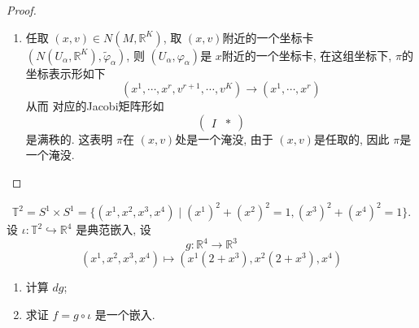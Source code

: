 \documentclass[../main.tex]{subfiles}
\begin{document}
\begin{proof}
\begin{enumerate}
\[   \begin{aligned}
     \tilde{\varphi} _{ \alpha }: N\left( U_{\alpha }, \mathbb{R} ^{K} \right)&\to  \varphi _{\alpha }\left( U_{\alpha } \right)\times \mathbb{R} ^{K-r}   \\ 
      \left( p, v_{p} \right)&\mapsto \left(  \varphi _{\alpha }\left( p \right), \left( \left<v_{p}, \left. E^{\alpha }_{r+ 1} \right|_{p} \right> ,\cdots , \left<v_{p},\left. E^{\alpha }_{K} \right|_{p} \right>\right)   \right)  
   \end{aligned}
    \]   它是一个连续的双射. 这样 \(  \left\{ \left( N\left( U_{\alpha }, \mathbb{R} ^{K} \right),  \tilde{\varphi} _{\alpha }  \right) \right\}   \) 构成 \(  N\left( M,\mathbb{R} ^{K} \right)   \)上的一族坐标卡. 最后, 我们来考虑这族坐标卡的过渡映射. 设 \(  \left( N\left( U_{\beta }, \mathbb{R} ^{K} \right),  \tilde{\varphi} _{\beta }  \right)   \)是另一个坐标卡, 则 过渡映射为\[
   \tilde{\varphi}_\beta \circ \tilde{\varphi}_\alpha^{-1}(x, c) = \left( (\varphi_\beta \circ \varphi_\alpha^{-1})(x), A(\varphi_\alpha^{-1}(x)) \cdot c \right)
    \] 其中  \(  A  \)是一个矩阵函数使得 $A_{ji}(p) = \langle E_i^\alpha(p), E_j^\beta(p) \rangle$, 是光滑的 . 又\(   \varphi _{\beta }\circ  \varphi _{\alpha }^{-1}   \)光滑,  因此 \(   \tilde{\varphi} _{\beta }\circ  \tilde{\varphi} _{\alpha }^{-1}   \)是光滑的. 因此 \(  \left\{ \left( N\left( U_{\alpha },\mathbb{R} ^{K} \right)   , \tilde{\varphi} _{\alpha } \right)  \right\}\)   构成 \(  N\left( M,\mathbb{R} ^{K} \right)   \)的一个光滑图册, 从而使得 其成为一个光滑流形. 

    \item 任取 \(  \left( x,v \right)\in N\left( M,\mathbb{R} ^{K} \right)    \), 取 \(  \left( x,v \right)   \)附近的一个坐标卡 \(  \left( N\left( U_{\alpha },\mathbb{R} ^{K} \right),  \tilde{\varphi} _{\alpha }  \right)   \), 则 \(  \left( U_{\alpha },  \varphi _{\alpha } \right)   \)是 \(  x  \)附近的一个坐标卡, 在这组坐标下,  \(   \pi   \)的坐标表示形如下 \[
    \left( x^{1},\cdots ,x^{r}, v^{r+ 1},\cdots ,v^{K} \right)\to \left( x^{1},\cdots ,x^{r} \right)  
    \]      从而 对应的Jacobi矩阵形如  \[
    \begin{pmatrix} 
        I&* 
    \end{pmatrix} 
    \]是满秩的. 这表明 \(   \pi   \)在 \(  \left( x,v \right)   \)处是一个淹没, 由于 \(  \left( x,v \right)   \)是任取的, 因此 \(   \pi   \)是一个淹没.    
  \end{enumerate}
\end{proof}
\begin{exercise}{}{}
$$\mathbb{T}^2 = S^1 \times S^1 = \{(x^1, x^2, x^3, x^4) \mid (x^1)^2 + (x^2)^2 = 1, (x^3)^2 + (x^4)^2 = 1\}.$$
设 $\iota: \mathbb{T}^2 \hookrightarrow \mathbb{R}^4$ 是典范嵌入, 设
$$g: \mathbb{R}^4 \to \mathbb{R}^3$$
$$(x^1, x^2, x^3, x^4) \mapsto (x^1(2+x^3), x^2(2+x^3), x^4)$$
\begin{enumerate}
\item 计算 $dg$;
\item 求证 $f = g \circ \iota$ 是一个嵌入.
\end{enumerate}
\end{exercise}
\end{document}
